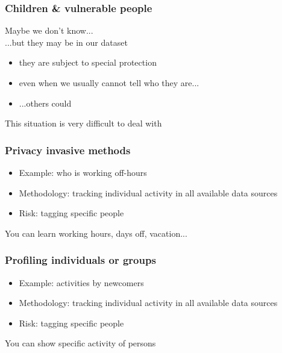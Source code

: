 \documentclass[17pt,aspectratio=169,hyperref={pdfusetitle,colorlinks,allcolors=olive}]{beamer}
\begin{document}
\begin{frame}[fragile]
  \frametitle{Children \& vulnerable people}

  Maybe we don't know...\\
  ...but they may be in our dataset\\
  
  \begin{itemize}
  \item they are subject to special protection
  \item even when we usually cannot tell who they are...
  \item ...others could
  \end{itemize}

  This situation is very difficult to deal with
\end{frame}

\begin{frame}[fragile]
  \frametitle{Privacy invasive methods}

  \begin{itemize}
  \item Example: who is working off-hours

  \item Methodology: tracking individual activity in all available data sources

  \item Risk: tagging specific people
  \end{itemize}
  
  \begin{flushright}
    You can learn working hours, days off, vacation...
  \end{flushright}
\end{frame}

\begin{frame}[fragile]
  \frametitle{Profiling individuals or groups}

  \begin{itemize}
  \item Example: activities by newcomers

  \item Methodology: tracking individual activity in all available data sources

  \item Risk: tagging specific people
  \end{itemize}
  
  \begin{flushright}
    You can show specific activity of persons
  \end{flushright}
\end{frame}
\end{document}
